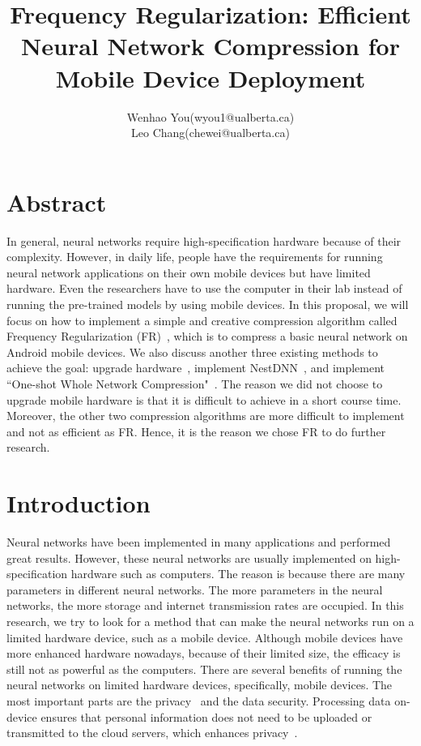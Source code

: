 \documentclass{article}
\title{Frequency Regularization: Efficient Neural Network Compression for Mobile Device Deployment}
\author{Wenhao You(wyou1@ualberta.ca)\\Leo Chang(chewei@ualberta.ca)}
\date{}
\begin{document}
	\maketitle
	
	\section{Abstract}

In general, neural networks require high-specification hardware because of their complexity. However, in daily life, people have the requirements for running neural network applications on their own mobile devices but have limited hardware. Even the researchers have to use the computer in their lab instead of running the pre-trained models by using mobile devices. In this proposal, we will focus on how to implement a simple and creative compression algorithm called Frequency Regularization (FR)~\cite{zhao2023frequency}, which is to compress a basic neural network on Android mobile devices. We also discuss another three existing methods to achieve the goal: upgrade hardware~\cite{akusok2019metal}, implement NestDNN~\cite{fang2018nestdnn}, and implement ``One-shot Whole Network Compression"~\cite{kim2016compression}. The reason we did not choose to upgrade mobile hardware is that it is difficult to achieve in a short course time. Moreover, the other two compression algorithms are more difficult to implement and not as efficient as FR. Hence, it is the reason we chose FR to do further research.



	\section{Introduction}
	
Neural networks have been implemented in many applications and performed great results. However, these neural networks are usually implemented on high-specification hardware such as computers. The reason is because there are many parameters in different neural networks. The more parameters in the neural networks, the more storage and internet transmission rates are occupied. In this research, we try to look for a method that can make the neural networks run on a limited hardware device, such as a mobile device. Although mobile devices have more enhanced hardware nowadays, because of their limited size, the efficacy is still not as powerful as the computers. There are several benefits of running the neural networks on limited hardware devices, specifically, mobile devices. The most important parts are the privacy~\cite{wang2018privacy} and the data security. Processing data on-device ensures that personal information does not need to be uploaded or transmitted to the cloud servers, which enhances privacy~\cite{wang2018privacy}. 
\end{document}
